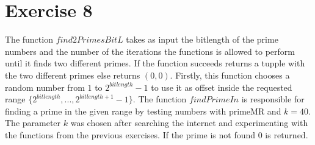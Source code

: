 \documentclass{article}
\begin{document}
\section*{Exercise 8}
The function $find2PrimesBitL$ takes as input the bitlength of the prime numbers and the number of the iterations the functions is allowed to perform until it finds two different primes. If the function succeeds returns a tupple with the two different primes else returns $(0,0)$. Firstly, this function chooses a random number from $1$ to $2^{bitlength}-1$ to use it as offset inside the requested range $\{2^{bitlength},...,2^{bitlength+1}-1\}$. The function $findPrimeIn$ is  responsible for finding a prime in the given range by testing numbers with primeMR and $k = 40$. The parameter $k$ was chosen after searching the internet and experimenting with the functions from the previous exercises. If the prime is not found 0 is returned. 

\end{document}
